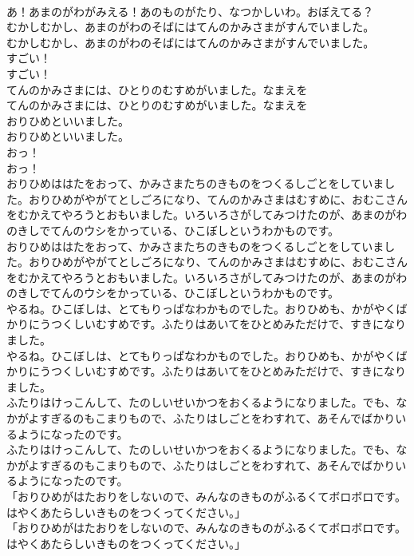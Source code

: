 \documentclass[8pt]{extreport}
\begin{document}
\begin{CJK}{UTF8}{min}
\\	あ！あまのがわがみえる！あのものがたり、なつかしいわ。おぼえてる？ 
\\	むかしむかし、あまのがわのそばにはてんのかみさまがすんでいました。	
\\	むかしむかし、あまのがわのそばにはてんのかみさまがすんでいました。 
\\	すごい！	
\\	すごい！ 
\\	てんのかみさまには、ひとりのむすめがいました。なまえを	
\\	てんのかみさまには、ひとりのむすめがいました。なまえを 
\\	おりひめといいました。	
\\	おりひめといいました。 
\\	おっ！	
\\	おっ！ 
\\	おりひめははたをおって、かみさまたちのきものをつくるしごとをしていました。おりひめがやがてとしごろになり、てんのかみさまはむすめに、おむこさんをむかえてやろうとおもいました。いろいろさがしてみつけたのが、あまのがわのきしでてんのウシをかっている、ひこぼしというわかものです。	
\\	おりひめははたをおって、かみさまたちのきものをつくるしごとをしていました。おりひめがやがてとしごろになり、てんのかみさまはむすめに、おむこさんをむかえてやろうとおもいました。いろいろさがしてみつけたのが、あまのがわのきしでてんのウシをかっている、ひこぼしというわかものです。 
\\	やるね。ひこぼしは、とてもりっぱなわかものでした。おりひめも、かがやくばかりにうつくしいむすめです。ふたりはあいてをひとめみただけで、すきになりました。	
\\	やるね。ひこぼしは、とてもりっぱなわかものでした。おりひめも、かがやくばかりにうつくしいむすめです。ふたりはあいてをひとめみただけで、すきになりました。 
\\	ふたりはけっこんして、たのしいせいかつをおくるようになりました。でも、なかがよすぎるのもこまりもので、ふたりはしごとをわすれて、あそんでばかりいるようになったのです。	
\\	ふたりはけっこんして、たのしいせいかつをおくるようになりました。でも、なかがよすぎるのもこまりもので、ふたりはしごとをわすれて、あそんでばかりいるようになったのです。 
\\	「おりひめがはたおりをしないので、みんなのきものがふるくてボロボロです。はやくあたらしいきものをつくってください。」	
\\	「おりひめがはたおりをしないので、みんなのきものがふるくてボロボロです。はやくあたらしいきものをつくってください。」 

\end{CJK}
\end{document}

